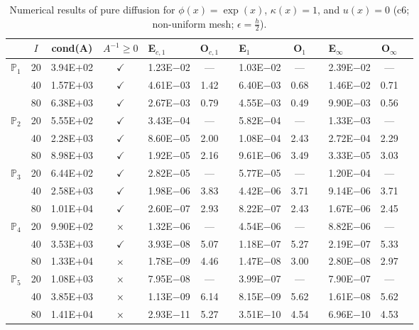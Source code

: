 \begin{table}[H]
\centering
\caption{Numerical results of pure diffusion for $\phi(x)=\exp(x)$, $\kappa(x)=1$, and $u(x)=0$ (c6; non-uniform mesh; $\epsilon=\frac{h}{2}$).}
\begin{tabular}{@{}l c c c l c c l c c l c c@{}}
\toprule
 & $I$ & cond(A) & $A^{-1}\geq 0$ &  E$_{c,1}$ & O$_{c,1}$ && E$_1$ & O$_1$ && E$_{\infty}$ & O$_{\infty}$\\
\midrule
\multirow{3}{*}{$\mathbb{P}_{1}$}
 & 20 & 3.94E$+$02 & $\checkmark$ & 1.23E$-$02 & --- && 1.03E$-$02 & --- && 2.39E$-$02 & ---\\
 & 40 & 1.57E$+$03 & $\checkmark$ & 4.61E$-$03 & 1.42 && 6.40E$-$03 & 0.68 && 1.46E$-$02 & 0.71\\
 & 80 & 6.38E$+$03 & $\checkmark$ & 2.67E$-$03 & 0.79 && 4.55E$-$03 & 0.49 && 9.90E$-$03 & 0.56\\
\midrule
\multirow{3}{*}{$\mathbb{P}_{2}$}
 & 20 & 5.55E$+$02 & $\checkmark$ & 3.43E$-$04 & --- && 5.82E$-$04 & --- && 1.33E$-$03 & ---\\
 & 40 & 2.28E$+$03 & $\checkmark$ & 8.60E$-$05 & 2.00 && 1.08E$-$04 & 2.43 && 2.72E$-$04 & 2.29\\
 & 80 & 8.98E$+$03 & $\checkmark$ & 1.92E$-$05 & 2.16 && 9.61E$-$06 & 3.49 && 3.33E$-$05 & 3.03\\
\midrule
\multirow{3}{*}{$\mathbb{P}_{3}$}
 & 20 & 6.44E$+$02 & $\checkmark$ & 2.82E$-$05 & --- && 5.77E$-$05 & --- && 1.20E$-$04 & ---\\
 & 40 & 2.58E$+$03 & $\checkmark$ & 1.98E$-$06 & 3.83 && 4.42E$-$06 & 3.71 && 9.14E$-$06 & 3.71\\
 & 80 & 1.01E$+$04 & $\checkmark$ & 2.60E$-$07 & 2.93 && 8.22E$-$07 & 2.43 && 1.67E$-$06 & 2.45\\
\midrule
\multirow{3}{*}{$\mathbb{P}_{4}$}
 & 20 & 9.90E$+$02 & $\times$ & 1.32E$-$06 & --- && 4.54E$-$06 & --- && 8.82E$-$06 & ---\\
 & 40 & 3.53E$+$03 & $\checkmark$ & 3.93E$-$08 & 5.07 && 1.18E$-$07 & 5.27 && 2.19E$-$07 & 5.33\\
 & 80 & 1.33E$+$04 & $\times$ & 1.78E$-$09 & 4.46 && 1.47E$-$08 & 3.00 && 2.80E$-$08 & 2.97\\
\midrule
\multirow{3}{*}{$\mathbb{P}_{5}$}
 & 20 & 1.08E$+$03 & $\times$ & 7.95E$-$08 & --- && 3.99E$-$07 & --- && 7.90E$-$07 & ---\\
 & 40 & 3.85E$+$03 & $\times$ & 1.13E$-$09 & 6.14 && 8.15E$-$09 & 5.62 && 1.61E$-$08 & 5.62\\
 & 80 & 1.41E$+$04 & $\times$ & 2.93E$-$11 & 5.27 && 3.51E$-$10 & 4.54 && 6.96E$-$10 & 4.53\\
\bottomrule
\end{tabular}
\end{table}